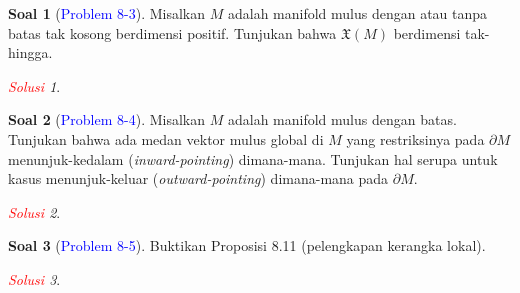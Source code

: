 \documentclass[11pt]{article}
\theoremstyle{definition}
\newtheorem*{problem}{Soal}
\theoremstyle{remark}
\newtheorem*{solution}{\textcolor{red}{Solusi}}
\begin{document}
\begin{problem}[\textcolor{blue}{Problem 8-3}]
Misalkan $M$ adalah manifold mulus dengan atau tanpa batas tak kosong berdimensi positif. Tunjukan bahwa $\mathfrak{X}(M)$ berdimensi tak-hingga.
\end{problem}
\begin{solution}
\end{solution}

\begin{problem}[\textcolor{blue}{Problem 8-4}]
Misalkan $M$ adalah manifold mulus dengan batas. Tunjukan bahwa ada medan vektor mulus global di $M$ yang restriksinya pada $\partial M$ menunjuk-kedalam (\textit{inward-pointing}) dimana-mana. Tunjukan hal serupa untuk kasus menunjuk-keluar (\textit{outward-pointing}) dimana-mana pada $\partial M$. 
\end{problem}
\begin{solution}
\end{solution}

\begin{problem}[\textcolor{blue}{Problem 8-5}]
Buktikan Proposisi 8.11 (pelengkapan kerangka lokal).
\end{problem}
\begin{solution}

\end{solution}
\end{document}
